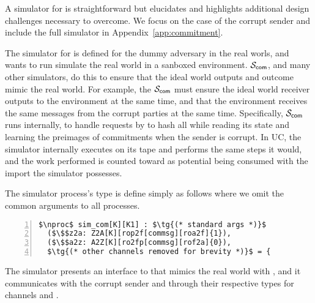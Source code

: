 A simulator for \protcom is straightforward but elucidates and highlights additional design challenges necessary to overcome.
We focus on the case of the corrupt sender and include the full simulator in Appendix~\ref{app:commitment}.

The simulator for \protcom is defined for the dummy adversary in the real worls, and wants to run simulate the real world in a sanboxed environment. 
$\mathcal{S}_{\mathsf{com}}$, and many other simulators, do this to ensure that the ideal world outputs and outcome mimic the real world.
For example, the $\mathcal{S}_{\mathsf{com}}$ must ensure the ideal world receiver outputs to the environment at the same time, and that the environment receives the same messages from the corrupt parties at the same time.
Specifically, $\mathcal{S}_{\mathsf{com}}$ runs \Fro internally, to handle requests by \Z to hash all while reading its state and learning the preimages of commitments when the sender is corrupt.
In UC, the simulator internally executes \Fro on its tape and performs the same steps it would, and the work performed is counted toward as potential being consumed with the import the simulator possesses.

The simulator process's type is define simply as follows where we omit the common arguments to all processes. 
\begin{lstlisting}[basicstyle=\scriptsize\BeraMonottFamily, mathescape, frame=single, numbers=left, xleftmargin=2em, xrightmargin=0em]
$\nproc$ sim_com[K][K1] : $\tg{(* standard args *)}$ 
  ($\$$z2a: Z2A[K][rop2f[commsg][roa2f]{1}), 
  ($\$$a2z: A2Z[K][ro2fp[commsg][rof2a]{0}),
  $\tg{(* other channels removed for brevity *)}$ = {
\end{lstlisting}
The simulator presents an interface to \Z that mimics the real world with \Fro, and it communicates with the corrupt sender and \Fcom through their respective types for channels  and .



